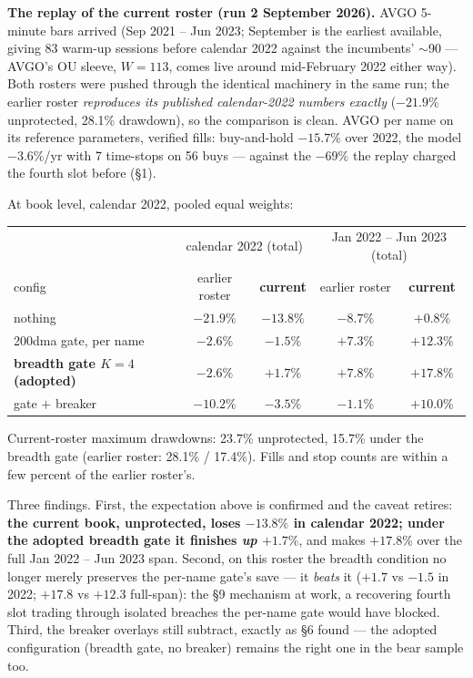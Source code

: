 \documentclass[11pt,a4paper]{article}
\newcommand{\tabnote}[1]{\begin{center}\begin{minipage}{0.92\textwidth}
  \footnotesize\color{bcgrey}#1\end{minipage}\end{center}}
\begin{document}
\textbf{The replay of the current roster (run 2 September 2026).} AVGO
5-minute bars arrived (Sep 2021 -- Jun 2023; September is the earliest
available, giving 83 warm-up sessions before calendar 2022 against the
incumbents' $\sim$90 --- AVGO's OU sleeve, $W{=}113$, comes live around
mid-February 2022 either way). Both rosters were pushed through the identical
machinery in the same run; the earlier roster \emph{reproduces its published
calendar-2022 numbers exactly} ($-21.9\%$ unprotected, 28.1\% drawdown), so
the comparison is clean. AVGO per name on its reference parameters, verified
fills: buy-and-hold $-15.7\%$ over 2022, the model $-3.6\%$/yr with 7
time-stops on 56 buys --- against the $-69\%$ the replay charged the fourth
slot before (\S1).

At book level, calendar 2022, pooled equal weights:

\begin{center}
\begin{tabular}{lcccc}
\toprule
 & \multicolumn{2}{c}{calendar 2022 (total)} & \multicolumn{2}{c}{Jan 2022 -- Jun 2023 (total)} \\
config & earlier roster & \textbf{current} & earlier roster & \textbf{current} \\
\midrule
nothing                    & $-21.9\%$ & $\mathbf{-13.8\%}$ & $-8.7\%$ & $\mathbf{+0.8\%}$ \\
200dma gate, per name      & $-2.6\%$  & $-1.5\%$           & $+7.3\%$ & $+12.3\%$ \\
\textbf{breadth gate $K{=}4$ (adopted)} & $-2.6\%$ & $\mathbf{+1.7\%}$ & $+7.8\%$ & $\mathbf{+17.8\%}$ \\
gate $+$ breaker           & $-10.2\%$ & $-3.5\%$           & $-1.1\%$ & $+10.0\%$ \\
\bottomrule
\end{tabular}
\end{center}

\tabnote{Current-roster maximum drawdowns: 23.7\% unprotected, 15.7\% under
the breadth gate (earlier roster: 28.1\% / 17.4\%). Fills and stop counts are
within a few percent of the earlier roster's.}

Three findings. First, the expectation above is confirmed and the caveat
retires: \textbf{the current book, unprotected, loses $-13.8\%$ in calendar
2022; under the adopted breadth gate it finishes \emph{up} $+1.7\%$}, and
makes $+17.8\%$ over the full Jan 2022 -- Jun 2023 span. Second, on this
roster the breadth condition no longer merely preserves the per-name gate's
save --- it \emph{beats} it ($+1.7$ vs $-1.5$ in 2022; $+17.8$ vs $+12.3$
full-span): the \S9 mechanism at work, a recovering fourth slot trading
through isolated breaches the per-name gate would have blocked. Third, the
breaker overlays still subtract, exactly as \S6 found --- the adopted
configuration (breadth gate, no breaker) remains the right one in the bear
sample too.
\end{document}
